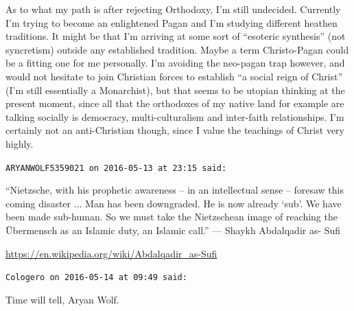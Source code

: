 \begin{footnotesize}
\begin{sffamily}
As to what my path is after rejecting Orthodoxy, I'm still undecided. Currently I'm trying to become an enlightened Pagan and I'm studying different heathen traditions. It might be that I'm arriving at some sort of ``esoteric synthesis'' (not syncretism) outside any established tradition. Maybe a term Christo-Pagan could be a fitting one for me personally. I'm avoiding the neo-pagan trap however, and would not hesitate to join Christian forces to establish ``a social reign of Christ'' (I'm still essentially a Monarchist), but that seems to be utopian thinking at the present moment, since all that the orthodoxes of my native land for example are talking socially is democracy, multi-culturalism and inter-faith relationships. I'm certainly not an anti-Christian though, since I value the teachings of Christ very highly.

\hfill

\texttt{ARYANWOLF5359021 on 2016-05-13 at 23:15 said:}

``Nietzsche, with his prophetic awareness -- in an intellectual sense -- foresaw this coming disaster ... Man has been downgraded. He is now already `sub'. We have been made sub-human. So we must take the Nietzschean image of reaching the Übermensch as an Islamic duty, an Islamic call.'' --- Shaykh Abdalqadir as- Sufi

\url{https://en.wikipedia.org/wiki/Abdalqadir_as-Sufi}


\hfill

\texttt{Cologero on 2016-05-14 at 09:49 said:}

Time will tell, Aryan Wolf.

\end{sffamily}
\end{footnotesize}


